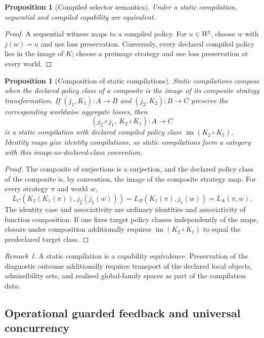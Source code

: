 \documentclass[11pt]{article}
\theoremstyle{plain}
\newtheorem{proposition}[theorem]{Proposition}
\theoremstyle{definition}
\theoremstyle{remark}
\newtheorem{remark}[theorem]{Remark}
\begin{document}
\begin{proposition}[Compiled selector semantics]\label{prop:FBcompile}
Under a static compilation, sequential and compiled capability are equivalent.
\end{proposition}

\begin{proof}
A sequential witness maps to a compiled policy. For $u\in W^\sharp$, choose
$w$ with $j(w)=u$ and use loss preservation. Conversely, every declared
compiled policy lies in the image of $K$; choose a preimage strategy and use
loss preservation at every world.
\end{proof}

\begin{proposition}[Composition of static compilations]
\label{prop:static-compilation-composition}
Static compilations compose when the declared policy class of a composite is the
image of its composite strategy transformation. If
\((j_1,K_1):A\to B\) and \((j_2,K_2):B\to C\) preserve the corresponding
worldwise aggregate losses, then
\[
(j_2\circ j_1,\ K_2\circ K_1):A\to C
\]
is a static compilation with declared compiled policy class
\(\operatorname{im}(K_2\circ K_1)\). Identity maps give identity compilations, so
static compilations form a category with this image-as-declared-class
convention.
\end{proposition}

\begin{proof}
The composite of surjections is a surjection, and the declared policy class of
the composite is, by convention, the image of the composite strategy map. For
every strategy \(\pi\) and world \(w\),
\[
L_C(K_2(K_1(\pi)),j_2(j_1(w)))
=L_B(K_1(\pi),j_1(w))
=L_A(\pi,w).
\]
The identity case and associativity are ordinary identities and associativity of
function composition. If one fixes target policy classes independently of the
maps, closure under composition additionally requires
\(\operatorname{im}(K_2\circ K_1)\) to equal the predeclared target class.
\end{proof}

\begin{remark}
A static compilation is a capability equivalence. Preservation of the diagnostic
outcome additionally requires transport of the declared local objects,
admissibility sets, and realised global-family spaces as part of the compilation
data.
\end{remark}

\subsection{Operational guarded feedback and universal concurrency}
\end{document}
